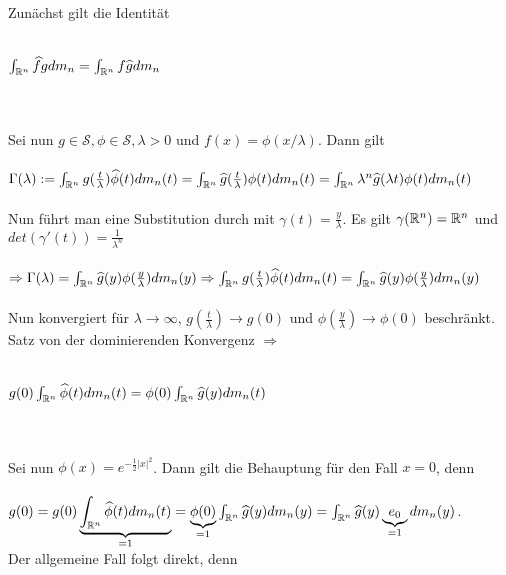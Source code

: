 \documentclass{article}
\begin{document}
\begin{beweis}
\begin{liste}
\item Zunächst gilt die Identität \\ \\
      \centerline{$\int_{\mathbb{R}^n} \widehat{f} g dm_n = \int_{\mathbb{R}^n} f \widehat{g} dm_n$} \\ \\
      Sei nun $g \in \mathcal{S}, \phi \in \mathcal{S}, \lambda > 0$ und $f(x) = \phi(x/\lambda)$. Dann gilt \\ \\
      $\Gamma(\lambda) := \int_{\mathbb{R}^n} g(\frac{t}{\lambda}) \widehat{\phi}(t) dm_n(t) = 
       \int_{\mathbb{R}^n} \widehat{g}(\frac{t}{\lambda}) \phi(t) dm_n(t) = 
       \int_{\mathbb{R}^n} \lambda^n \widehat{g}(\lambda t) \phi(t) dm_n(t)$ \\ \\
      Nun führt man eine Substitution durch mit $\gamma(t) = \frac{y}{\lambda}$. Es gilt $\gamma(\mathbb{R}^n) = \mathbb{R}^n$ und 
      $det(\gamma'(t)) = \frac{1}{\lambda^n} $ \\ \\
      $\Rightarrow \Gamma(\lambda) = \int_{\mathbb{R}^n} \widehat{g}(y) \phi(\frac{y}{\lambda}) dm_n(y) \\ \\
      \Rightarrow \int_{\mathbb{R}^n} g(\frac{t}{\lambda}) \widehat{\phi}(t) dm_n(t) = 
      \int_{\mathbb{R}^n} \widehat{g}(y) \phi(\frac{y}{\lambda}) dm_n(y)$ \\ \\
      Nun konvergiert für $\lambda \to \infty$, $g(\frac{t}{\lambda}) \to g(0)$ und $\phi(\frac{y}{\lambda}) \to \phi(0)$ beschränkt. \\
	  Satz von der dominierenden Konvergenz $\Rightarrow$ \\ \\
	  \centerline{$g(0) \int_{\mathbb{R}^n} \widehat{\phi}(t) dm_n(t) = 
       \phi(0) \int_{\mathbb{R}^n} \widehat{g}(y) dm_n(t)	$} \\ \\
      Sei nun $\phi(x) = e^{-\frac{1}{2}|x|^2}$. Dann gilt die Behauptung für den Fall $x = 0$, denn\\ \\
      $g(0) = g(0) \underbrace{\int_{\mathbb{R}^n} \widehat{\phi}(t) dm_n(t)}_{=1} = 
      \underbrace{\phi(0)}_{=1} \int_{\mathbb{R}^n} \widehat{g}(y) dm_n(y)	= \int_{\mathbb{R}^n} \widehat{g}(y) \underbrace{e_0}_{=1} dm_n(y)$. \\ 
      Der allgemeine Fall folgt direkt, denn \\ \\

\end{liste}
\end{beweis}
\end{document}
